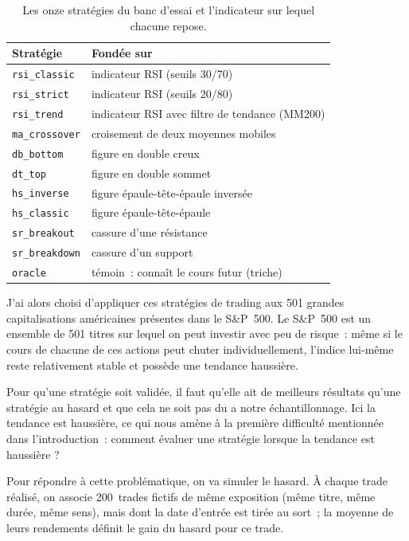 \begin{table}[H]
\centering
\caption{Les onze stratégies du banc d'essai et l'indicateur sur lequel chacune repose.}
\label{tab:strategies}
\renewcommand{\arraystretch}{1.25}
\small
\begin{tabular}{@{}ll@{}}
\toprule
Stratégie & Fondée sur \\
\midrule
\texttt{rsi\_classic}  & indicateur RSI (seuils 30/70) \\
\texttt{rsi\_strict}   & indicateur RSI (seuils 20/80) \\
\texttt{rsi\_trend}    & indicateur RSI avec filtre de tendance (MM200) \\
\texttt{ma\_crossover} & croisement de deux moyennes mobiles \\
\texttt{db\_bottom}    & figure en double creux \\
\texttt{dt\_top}       & figure en double sommet \\
\texttt{hs\_inverse}   & figure épaule-tête-épaule inversée \\
\texttt{hs\_classic}   & figure épaule-tête-épaule \\
\texttt{sr\_breakout}  & cassure d'une résistance \\
\texttt{sr\_breakdown} & cassure d'un support \\
\midrule
\texttt{oracle}        & témoin~: connaît le cours futur (triche) \\
\bottomrule
\end{tabular}
\end{table}

J'ai alors choisi d'appliquer ces stratégies de trading aux
501 grandes capitalisations américaines présentes dans le S\&P~500.
Le S\&P~500 est un ensemble de 501 titres sur lequel on peut investir avec peu de
risque~: même si le cours de chacune de ces actions peut chuter
individuellement, l'indice lui-même reste relativement stable et possède une tendance
haussière.

Pour qu'une stratégie soit validée, il faut qu'elle ait de meilleurs
résultats qu'une stratégie au hasard et que cela ne soit pas du a 
notre échantillonnage.
Ici la tendance est haussière, ce qui nous amène à la première
difficulté mentionnée dans l'introduction~: comment évaluer une 
stratégie lorsque la tendance est haussière ?

Pour répondre à cette problématique, on va simuler le hasard.
À chaque trade réalisé, on associe 200~trades fictifs de même exposition
(même titre, même durée, même sens), mais dont la date
d'entrée est tirée au sort~; la moyenne de leurs rendements définit le
gain du hasard pour ce trade.

